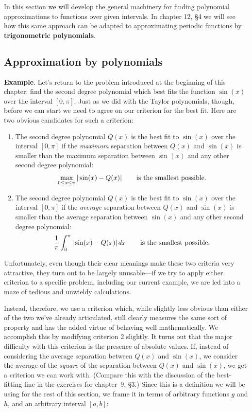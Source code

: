 {{{{In this section we will develop the general machinery for finding
polynomial approximations to functions over given intervals.  In chapter
12, \S4 we will see how this same approach can be adapted to
approximating periodic functions by {\bf trigonometric polynomials}.

\subsection{Approximation by polynomials}


{\bf Example}.  Let's return to the problem introduced at the beginning of this chapter: find the second degree polynomial which best fits the function $\sin(x)$ over the interval $[0, \pi]$.  
Just as we did with the Taylor polynomials, though, before we can start we need to agree on our criterion for the best fit. Here are two obvious candidates for such a criterion:
 
\newpage

\mbox{} 
\begin{enumerate}
\item The second degree polynomial $Q(x)$ is the best fit to $\sin(x)$ over the interval $[0, \pi]$ if the {\em maximum} separation between $Q(x)$ and 
$\sin(x)$ is smaller than the maximum separation between $\sin(x)$ and any other second degree polynomial:
\[
\max_{0\le x\le \pi}|\sin(x)-Q(x)| \hspace{.25in} \mbox{ is the smallest possible.}
\]
\item The second degree polynomial $Q(x)$ is the best fit to $\sin(x)$ over the interval $[0, \pi]$ if the {\em average} separation between $Q(x)$ and $\sin(x)$ is smaller than the average separation between $\sin(x)$ and any other second degree polynomial:
\[
{1 \over \pi }\int_0^{\pi} |\sin(x)-Q(x)|\, dx \hspace{.25in} \mbox{ is the smallest possible.}
\]
\end {enumerate}

Unfortunately, even though their clear meanings make these two criteria very attractive, they turn out to be largely 
unusable---if we try to apply either criterion to a specific problem, 
including our current example, we are led into a maze of tedious and unwieldy calculations.  

Instead, therefore, we use a criterion
which, while slightly less obvious than either of the two we've already articulated, still clearly measures the same sort of property and has the added virtue of behaving well mathematically.  We accomplish this by modifying criterion 2 slightly.  It turns out that the major difficulty with this criterion is the presence of absolute values.  If, instead of considering the average separation between $Q(x)$ and $\sin(x)$, we consider the average of the {\em square} of the separation between $Q(x)$ and $\sin(x)$, we get a criterion we can work with.  (Compare this with the discussion of the best-fitting line in the exercises for chapter~9, \S 3.)  Since this is a definition we will be using for the rest of this section, we frame it in terms of arbitrary functions $g$ and $h$, and an arbitrary interval $[a, b]$:

}}}}
